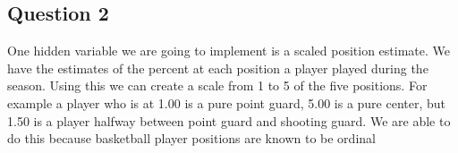 \documentclass[12pt, letterpaper, titlepage]{article}
\begin{document}
\subsection{Question 2}
One hidden variable we are going to implement is a scaled position estimate. We
have the estimates of the percent at each position a player played during the
season.  Using this we can create a scale from 1 to 5 of the five positions.  For
example a player who is at 1.00 is a pure point guard, 5.00 is a pure center,
but 1.50 is a player halfway between point guard and shooting guard.  We are able
to do this because basketball player positions are known to be ordinal
\end{document}
